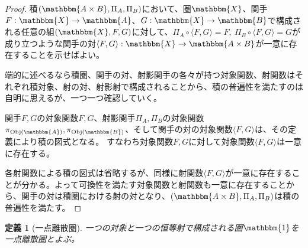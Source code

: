 \documentclass[dvipdfmx]{jsarticle}
\newcommand{\cat}[1]{\mathbbm{#1}}
\newcommand{\arrow}{\rightarrow}
\newcommand{\functor}[3]{#1:\cat{#2}\arrow \cat{#3}}
\newcommand{\tuple}[1]{\langle #1\rangle}
\newcommand{\obj}[1]{\mathrm{Obj}(\cat{#1})}
\newtheorem{proof}{証明}[section]
\newtheorem{define}{定義}[section]
\numberwithin{proof}{subsection}
\numberwithin{prop}{subsection}
\numberwithin{define}{subsection}
\begin{document}
	\begin{proof}
		積$(\cat{A\times B},\Pi_A,\Pi_B)$において、圏$\cat{X}$、関手$\functor{F}{X}{A}$、$\functor{G}{X}{B}$で構成される任意の組$(\cat{X},F,G)$に対して、$\Pi_A\circ\tuple{F,G}=F,\ \Pi_B\circ\tuple{F,G}=G$が成り立つような関手の対$\functor{\tuple{F,G}}{X}{A\times B}$が一意に存在することを示せばよい。
		\begin{center}
		\end{center}
		端的に述べるなら積圏、関手の対、射影関手の各々が持つ対象関数、射関数はそれぞれ積対象、射の対、射影射で構成されることから、積の普遍性を満たすのは自明に思えるが、一つ一つ確認していく。

		関手$F,G$の対象関数$F,G$、射影関手$\Pi_A,\Pi_B$の対象関数$\pi_{\obj{A}},\pi_{\obj{B}}$、そして関手の対の対象関数$\tuple{F,G}$は、その定義により積の図式となる。
		すなわち対象関数$F,G$に対して対象関数$\tuple{F,G}$は一意に存在する。
		\begin{center}
		\end{center}
		各射関数による積の図式は省略するが、同様に射関数$\tuple{F,G}$が一意に存在することが分かる。よって可換性を満たす対象関数と射関数も一意に存在することから、関手の対は積圏における射の対となり、$(\cat{A\times B},\Pi_A,\Pi_B)$は積の普遍性を満たす。
	\end{proof}
	\begin{define}[一点離散圏]
	一つの対象と一つの恒等射で構成される圏$\cat{1}$を一点離散圏とよぶ。
	\end{define}
\end{document}
